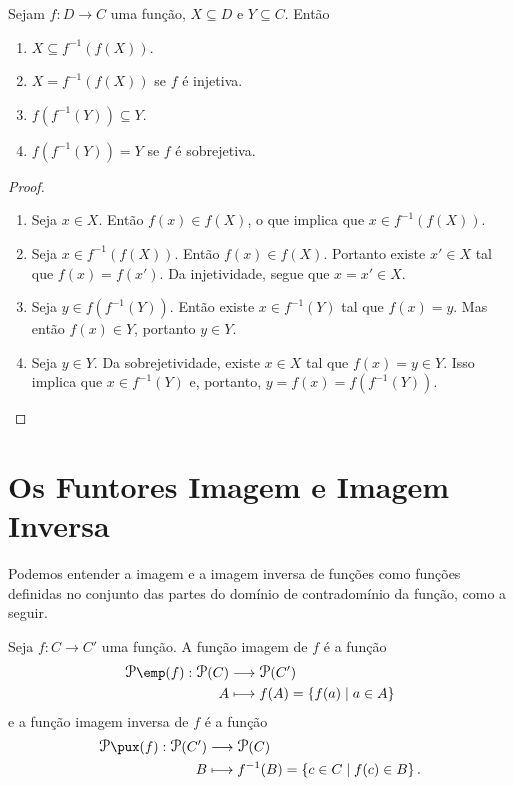 \begin{prop}
Sejam $f: D \to C$ uma função, $X \subseteq D$ e $Y \subseteq C$. Então
	\begin{enumerate}
	\item $X \subseteq f^{-1}(f(X))$.
	\item $X = f^{-1}(f(X))$ se $f$ é injetiva.
	\item $f(f^{-1}(Y)) \subseteq Y$.
	\item $f(f^{-1}(Y)) = Y$ se $f$ é sobrejetiva.
	\end{enumerate}
\end{prop}
\begin{proof}
	\begin{enumerate}
	\item Seja $x \in X$. Então $f(x) \in f(X)$, o que implica que $x \in f^{-1}(f(X))$.
	
	\item Seja $x \in f^{-1}(f(X))$. Então $f(x) \in f(X)$. Portanto existe $x' \in X$ tal que $f(x)=f(x')$. Da injetividade, segue que $x=x' \in X$.
	
	\item Seja $y \in f(f^{-1}(Y))$. Então existe $x \in f^{-1}(Y)$ tal que $f(x)=y$. Mas então $f(x) \in Y$, portanto $y \in Y$.
	
	\item Seja $y \in Y$. Da sobrejetividade, existe $x \in X$ tal que $f(x)=y \in Y$. Isso implica que $x \in f^{-1}(Y)$ e, portanto, $y=f(x)=f(f^{-1}(Y))$.
	\end{enumerate}
\end{proof}



\section{Os Funtores Imagem e Imagem Inversa}

Podemos entender a imagem e a imagem inversa de funções como funções definidas no conjunto das partes do domínio de contradomínio da função, como a seguir.

Seja $f\colon C \to C'$ uma função. A função imagem de $f$ é a função
	\begin{align*}
	\func{\p\emp(f)}{\p(C)}{\p(C')}{A}{f(A) = \set{f(a)}{a \in A}}
	\end{align*}
e a função imagem inversa de $f$ é a função
	\begin{align*}
	\func{\p\pux(f)}{\p(C')}{\p(C)}{B}{f\inv(B) = \set{c \in C}{f(c) \in B}.}
	\end{align*}

